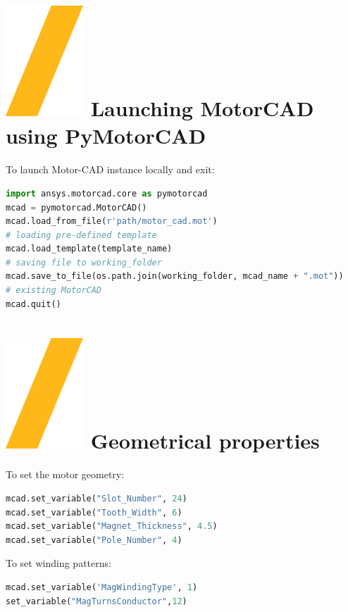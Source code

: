 \documentclass[landscape]{article}
\begin{document}
\begin{multicols}{3}
\setlength{\premulticols}{1pt}
\setlength{\postmulticols}{1pt}
\setlength{\multicolsep}{1pt}
\setlength{\columnsep}{2pt}

\vfill
\section{\includegraphics[height=\fontcharht\font`\S]{slash.png} Launching MotorCAD using PyMotorCAD}
To launch Motor-CAD instance locally and exit:
\begin{lstlisting}[language=Python]
import ansys.motorcad.core as pymotorcad
mcad = pymotorcad.MotorCAD()
mcad.load_from_file(r'path/motor_cad.mot')
# loading pre-defined template
mcad.load_template(template_name)
# saving file to working_folder
mcad.save_to_file(os.path.join(working_folder, mcad_name + ".mot"))
# existing MotorCAD
mcad.quit()
\end{lstlisting}


\section{\includegraphics[height=\fontcharht\font`\S]{slash.png} Geometrical properties}
To set the motor geometry:
\begin{lstlisting}[language=Python]
mcad.set_variable("Slot_Number", 24)
mcad.set_variable("Tooth_Width", 6)
mcad.set_variable("Magnet_Thickness", 4.5)
mcad.set_variable("Pole_Number", 4)
\end{lstlisting}
To set winding patterns:
\begin{lstlisting}[language=Python]
mcad.set_variable('MagWindingType', 1)
set_variable("MagTurnsConductor",12)
\end{lstlisting}


\end{multicols}
\end{document}
